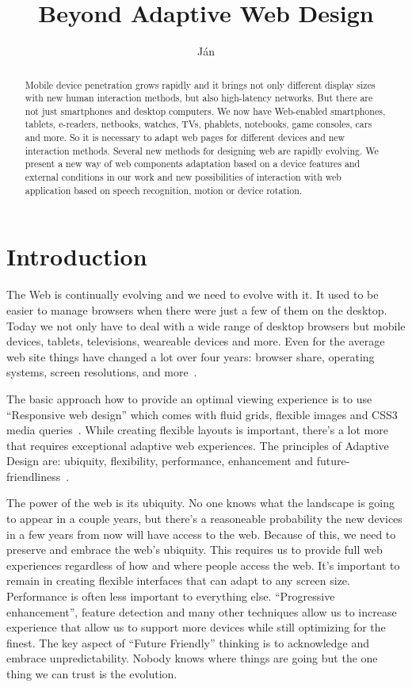 \documentclass{iitsrc}
\title{Beyond Adaptive Web Design}
\author{Ján}{Antala}
\begin{document}
\begin{abstract}
Mobile device penetration grows rapidly and it brings not only different display sizes with new human interaction methods, but also high-latency networks. But there are not just smartphones and desktop computers. We now have Web-enabled smartphones, tablets, e-readers, netbooks, watches, TVs, phablets, notebooks, game consoles, cars and more. So it is necessary to adapt web pages for different devices and new interaction methods. Several new methods for designing web are rapidly evolving. We present a new way of web components adaptation based on a device features and external conditions in our work and new possibilities of interaction with web application based on speech recognition, motion or device rotation.
\end{abstract}

\section{Introduction}

The Web is continually evolving and we need to evolve with it. It used to be easier to manage browsers when there were just a few of them on the desktop. Today we not only have to deal with a wide range of desktop browsers but mobile devices, tablets, televisions, weareable devices and more. Even for the average web site things have changed a lot over four years: browser share, operating systems, screen resolutions, and more~\cite{ui17}.

The basic approach how to provide an optimal viewing experience is to use ``Responsive web design'' which comes with fluid grids, flexible images and CSS3 media queries~\cite{responsive}. While creating flexible layouts is important, there's a lot more that requires exceptional adaptive web experiences. The principles of Adaptive Design are: ubiquity, flexibility, performance, enhancement and future-friendliness~\cite{adaptivesxsw}.

The power of the web is its ubiquity. No one knows what the landscape is going to appear in a couple years, but there's a reasoneable probability the new devices in a few years from now will have access to the web. Because of this, we need to preserve and embrace the web's ubiquity. This requires us to provide full web experiences regardless of how and where people access the web. It's important to remain in creating flexible interfaces that can adapt to any screen size. Performance is often less important to everything else. ``Progressive enhancement'', feature detection and many other techniques allow us to increase experience that allow us to support more devices while still optimizing for the finest. The key aspect of ``Future Friendly'' thinking is to acknowledge and embrace unpredictability. Nobody knows where things are going but the one thing we can trust is the evolution.
\end{document}
